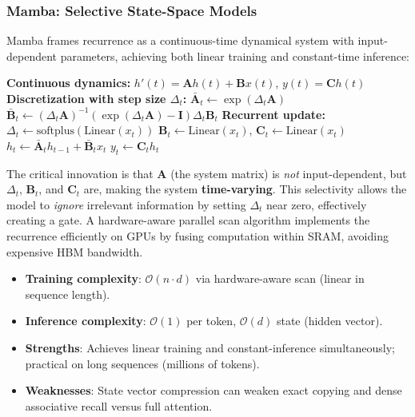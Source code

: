 \subsubsection{Mamba: Selective State-Space Models}
Mamba \citep{gu_mamba_2023} frames recurrence as a continuous-time dynamical system with input-dependent parameters, achieving both linear training and constant-time inference:

\begin{algorithmic}[1]
\State \textbf{Continuous dynamics:} $h'(t) = \mathbf{A} h(t) + \mathbf{B} x(t)$, \quad $y(t) = \mathbf{C} h(t)$
\State \textbf{Discretization with step size $\Delta_t$:}
\State $\bar{\mathbf{A}}_t \gets \exp(\Delta_t \mathbf{A})$
\State $\bar{\mathbf{B}}_t \gets (\Delta_t \mathbf{A})^{-1} (\exp(\Delta_t \mathbf{A}) - \mathbf{I}) \Delta_t \mathbf{B}_t$
\State \textbf{Recurrent update:}
    \State $\Delta_t \gets \text{softplus}(\text{Linear}(x_t))$ 
    \State $\mathbf{B}_t \gets \text{Linear}(x_t)$, \quad $\mathbf{C}_t \gets \text{Linear}(x_t)$ 
    \State $h_t \gets \bar{\mathbf{A}}_t h_{t-1} + \bar{\mathbf{B}}_t x_t$ 
    \State $y_t \gets \mathbf{C}_t h_t$ 
\EndFor
\end{algorithmic}

The critical innovation is that $\mathbf{A}$ (the system matrix) is \textit{not} input-dependent, but $\Delta_t$, $\mathbf{B}_t$, and $\mathbf{C}_t$ are, making the system \textbf{time-varying}. This selectivity allows the model to \textit{ignore} irrelevant information by setting $\Delta_t$ near zero, effectively creating a gate. A hardware-aware parallel scan algorithm implements the recurrence efficiently on GPUs by fusing computation within SRAM, avoiding expensive HBM bandwidth.

\begin{itemize}[leftmargin=*]
    \item \textbf{Training complexity}: $\mathcal{O}(n \cdot d)$ via hardware-aware scan (linear in sequence length).
    \item \textbf{Inference complexity}: $\mathcal{O}(1)$ per token, $\mathcal{O}(d)$ state (hidden vector).
    \item \textbf{Strengths}: Achieves linear training and constant-inference simultaneously; practical on long sequences (millions of tokens).
    \item \textbf{Weaknesses}: State vector compression can weaken exact copying and dense associative recall versus full attention.
\end{itemize}

